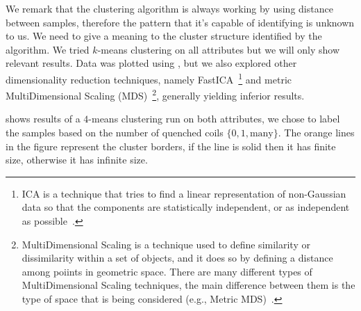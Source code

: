 We remark that the clustering algorithm is always working by using distance between samples,
therefore the pattern that it's capable of identifying is unknown to us. We need to give a meaning
to the cluster structure identified by the algorithm. We tried $k$-means clustering on all
attributes but we will only show relevant results. Data was plotted using \pca, but we also explored
other dimensionality reduction techniques, namely FastICA~\footnote{
	ICA is a technique that tries to find a linear representation of non-Gaussian data so that
	the components are statistically independent, or as independent as possible~\cite{hyvarinen2000-fastICA}.
} and metric MultiDimensional Scaling (MDS)~\footnote{
	MultiDimensional Scaling is a technique used to define similarity or dissimilarity within a
	set of objects, and it does so by defining a distance among poiints in geometric space.
	There are many different types of MultiDimensional Scaling techniques, the main difference
	between them is the type of space that is being considered (e.g., Metric
	MDS)~\cite{Borg2005-metricMDS}.
}, generally yielding inferior results.

 shows results of a $4$-means clustering run on both attributes, we chose
to label the samples based on the number of quenched coils $\{0, 1, \text{many}\}$. The orange lines
in the figure represent the cluster borders, if the line is solid then it has finite size, otherwise
it has infinite size.

